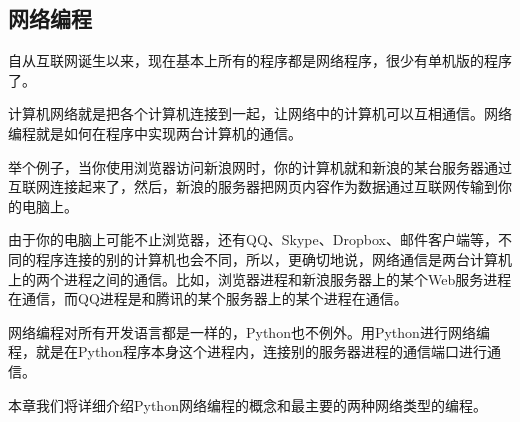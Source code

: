 \hypertarget{ux7f51ux7edcux7f16ux7a0b}{%
\subsection{网络编程}\label{ux7f51ux7edcux7f16ux7a0b}}

自从互联网诞生以来，现在基本上所有的程序都是网络程序，很少有单机版的程序了。

计算机网络就是把各个计算机连接到一起，让网络中的计算机可以互相通信。网络编程就是如何在程序中实现两台计算机的通信。

举个例子，当你使用浏览器访问新浪网时，你的计算机就和新浪的某台服务器通过互联网连接起来了，然后，新浪的服务器把网页内容作为数据通过互联网传输到你的电脑上。

由于你的电脑上可能不止浏览器，还有QQ、Skype、Dropbox、邮件客户端等，不同的程序连接的别的计算机也会不同，所以，更确切地说，网络通信是两台计算机上的两个进程之间的通信。比如，浏览器进程和新浪服务器上的某个Web服务进程在通信，而QQ进程是和腾讯的某个服务器上的某个进程在通信。

网络编程对所有开发语言都是一样的，Python也不例外。用Python进行网络编程，就是在Python程序本身这个进程内，连接别的服务器进程的通信端口进行通信。

本章我们将详细介绍Python网络编程的概念和最主要的两种网络类型的编程。

